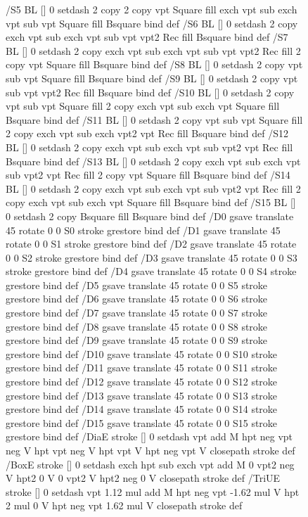 \documentclass{LMCS}
\begin{document}
\begin{figure}[!tbp]
{{{/S5 { BL [] 0 setdash 2 copy 2 copy vpt Square fill
       exch vpt sub exch vpt sub vpt Square fill Bsquare } bind def
/S6 { BL [] 0 setdash 2 copy exch vpt sub exch vpt sub vpt vpt2 Rec fill Bsquare } bind def
/S7 { BL [] 0 setdash 2 copy exch vpt sub exch vpt sub vpt vpt2 Rec fill
       2 copy vpt Square fill
       Bsquare } bind def
/S8 { BL [] 0 setdash 2 copy vpt sub vpt Square fill Bsquare } bind def
/S9 { BL [] 0 setdash 2 copy vpt sub vpt vpt2 Rec fill Bsquare } bind def
/S10 { BL [] 0 setdash 2 copy vpt sub vpt Square fill 2 copy exch vpt sub exch vpt Square fill
       Bsquare } bind def
/S11 { BL [] 0 setdash 2 copy vpt sub vpt Square fill 2 copy exch vpt sub exch vpt2 vpt Rec fill
       Bsquare } bind def
/S12 { BL [] 0 setdash 2 copy exch vpt sub exch vpt sub vpt2 vpt Rec fill Bsquare } bind def
/S13 { BL [] 0 setdash 2 copy exch vpt sub exch vpt sub vpt2 vpt Rec fill
       2 copy vpt Square fill Bsquare } bind def
/S14 { BL [] 0 setdash 2 copy exch vpt sub exch vpt sub vpt2 vpt Rec fill
       2 copy exch vpt sub exch vpt Square fill Bsquare } bind def
/S15 { BL [] 0 setdash 2 copy Bsquare fill Bsquare } bind def
/D0 { gsave translate 45 rotate 0 0 S0 stroke grestore } bind def
/D1 { gsave translate 45 rotate 0 0 S1 stroke grestore } bind def
/D2 { gsave translate 45 rotate 0 0 S2 stroke grestore } bind def
/D3 { gsave translate 45 rotate 0 0 S3 stroke grestore } bind def
/D4 { gsave translate 45 rotate 0 0 S4 stroke grestore } bind def
/D5 { gsave translate 45 rotate 0 0 S5 stroke grestore } bind def
/D6 { gsave translate 45 rotate 0 0 S6 stroke grestore } bind def
/D7 { gsave translate 45 rotate 0 0 S7 stroke grestore } bind def
/D8 { gsave translate 45 rotate 0 0 S8 stroke grestore } bind def
/D9 { gsave translate 45 rotate 0 0 S9 stroke grestore } bind def
/D10 { gsave translate 45 rotate 0 0 S10 stroke grestore } bind def
/D11 { gsave translate 45 rotate 0 0 S11 stroke grestore } bind def
/D12 { gsave translate 45 rotate 0 0 S12 stroke grestore } bind def
/D13 { gsave translate 45 rotate 0 0 S13 stroke grestore } bind def
/D14 { gsave translate 45 rotate 0 0 S14 stroke grestore } bind def
/D15 { gsave translate 45 rotate 0 0 S15 stroke grestore } bind def
/DiaE { stroke [] 0 setdash vpt add M
  hpt neg vpt neg V hpt vpt neg V
  hpt vpt V hpt neg vpt V closepath stroke } def
/BoxE { stroke [] 0 setdash exch hpt sub exch vpt add M
  0 vpt2 neg V hpt2 0 V 0 vpt2 V
  hpt2 neg 0 V closepath stroke } def
/TriUE { stroke [] 0 setdash vpt 1.12 mul add M
  hpt neg vpt -1.62 mul V
  hpt 2 mul 0 V
  hpt neg vpt 1.62 mul V closepath stroke } def
}}}
\end{figure}
\end{document}
